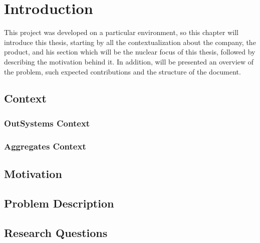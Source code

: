 \newcommand{\novathesis}{\emph{novathesis}}
\newcommand{\novathesisclass}{\texttt{novathesis.cls}}


\chapter{Introduction}
\label{cha:introduction}

This project was developed on a particular environment, so this chapter will 
introduce this thesis, starting by all the contextualization about the company, 
the product, and his section which will be the nuclear focus of this thesis, 
followed by describing the motivation behind it. In addition, will be presented 
an overview of the problem, such expected contributions and the structure of the 
document. 

\section{Context} 
\label{sec:context}

\subsection{OutSystems Context}
\label{subsec:outsystems_context}

\subsection{Aggregates Context}
\label{subsec:aggregates_context}

\section{Motivation}
\label{sec:motivation}

\section{Problem Description}
\label{sec:problem_description}

\section{Research Questions}
\label{sec:research_questions}

